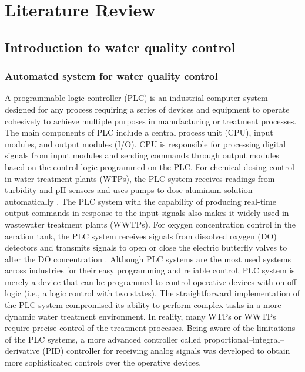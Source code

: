 \chapter{Literature Review}
\section{Introduction to water quality control}
\subsection{Automated system for water quality control}
A programmable logic controller (PLC) is an industrial computer system designed for any process requiring a series of devices and equipment to operate cohesively to achieve multiple purposes in manufacturing or treatment processes. The main components of PLC include a central process unit (CPU), input modules, and output modules (I/O). CPU is responsible for processing digital signals from input modules and sending commands through output modules based on the control logic programmed on the PLC. For chemical dosing control in water treatment plants (WTPs), the PLC system receives readings from turbidity and pH sensors and uses pumps to dose aluminum solution automatically \citep{andhareSCADAToolIncrease2014}. The PLC system with the capability of producing real-time output commands in response to the input signals also makes it widely used in wastewater treatment plants (WWTPs). For oxygen concentration control in the aeration tank, the PLC system receives signals from dissolved oxygen (DO) detectors and transmits signals to open or close the electric butterfly valves to alter the DO concentration \citep{zhuApplicationPLCSewage2017}. Although PLC systems are the most used systems across industries for their easy programming and reliable control, PLC system is merely a device that can be programmed to control operative devices with on-off logic (i.e., a logic control with two states). The straightforward implementation of the PLC system compromised its ability to perform complex tasks in a more dynamic water treatment environment. In reality, many WTPs or WWTPs require precise control of the treatment processes. Being aware of the limitations of the PLC systems, a more advanced controller called proportional–integral–derivative (PID) controller for receiving analog signals was developed to obtain more sophisticated controls over the operative devices.

